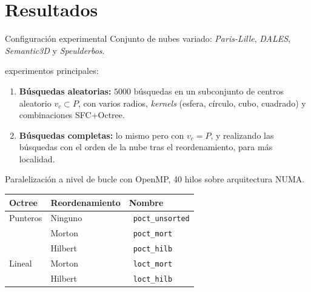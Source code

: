\documentclass[aspectratio=169]{beamer}
\newcommand{\dotUnencoded}{\textcolor{octUnencoded}{\textbullet}~}
\newcommand{\dotOctMort}{\textcolor{octMort}{\textbullet}~}
\newcommand{\dotOctHilb}{\textcolor{octHilb}{\textbullet}~}
\newcommand{\dotLoctMort}{\textcolor{loctMort}{\textbullet}~}
\newcommand{\dotLoctHilb}{\textcolor{loctHilb}{\textbullet}~}
\begin{document}
\section{Resultados}
\begin{frame}{Configuración experimental}
    Conjunto de nubes variado: \textit{Paris-Lille}, \textit{DALES}, \textit{Semantic3D} y \textit{Speulderbos}. %

    \textrightarrow {} experimentos principales:
    \begin{enumerate}
        \item \textbf{Búsquedas aleatorias:} $5000$ búsquedas en un subconjunto de centros aleatorio $v_c \subset P$, con varios radios, \textit{kernels} (esfera, círculo, cubo, cuadrado) y combinaciones SFC+Octree. 
        \item \textbf{Búsquedas completas:} lo mismo pero con $v_c = P$, y realizando las búsquedas con el orden de la nube tras el reordenamiento, para más localidad.
    \end{enumerate}
    \textrightarrow \: Paralelización a nivel de bucle con OpenMP, 40 hilos sobre arquitectura NUMA.

    \begin{table}
    
        \begin{tabular}{@{}lll@{}}
            \textbf{Octree} & \textbf{Reordenamiento} & \textbf{Nombre} \\
            \hline
            Punteros        & Ninguno       & \dotUnencoded \texttt{poct\_unsorted} \\
                            & Morton        & \dotOctMort \texttt{poct\_mort} \\
                            & Hilbert       & \dotOctHilb \texttt{poct\_hilb} \\
            \hline
            Lineal          & Morton        & \dotLoctMort \texttt{loct\_mort} \\
                            & Hilbert       & \dotLoctHilb \texttt{loct\_hilb} \\
        \end{tabular}
    \end{table}
\end{frame}
\end{document}
